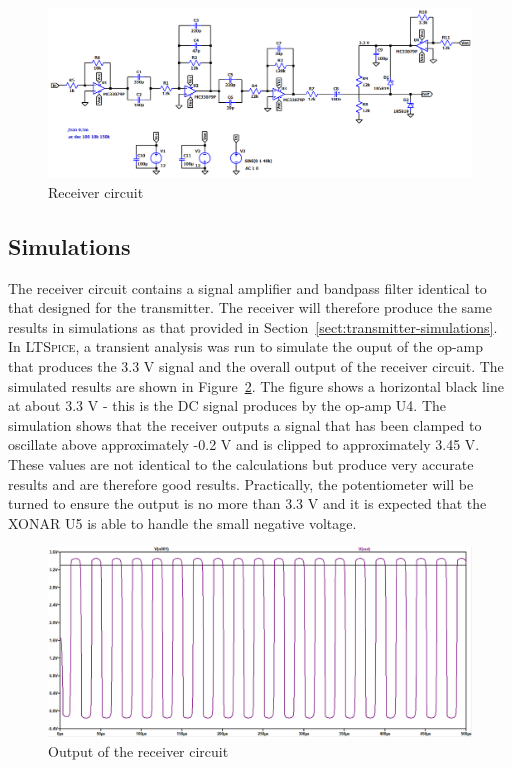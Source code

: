 \documentclass[class=report,11pt,crop=false]{standalone}
\begin{document}
\begin{figure}[htbp]
    \centering
    \includegraphics[width=0.8\columnwidth]{../Images/receiver_circuit_diagram.png}
    \caption{Receiver circuit}
    \label{fig:receiver-circuit}
\end{figure}

\subsection{Simulations}
The receiver circuit contains a signal amplifier and bandpass filter identical to that designed for the transmitter. The receiver will therefore produce the same results in simulations as that provided in Section~\ref{sect:transmitter-simulations}. In \textsc{LTSpice}, a transient analysis was run to simulate the ouput of the op-amp that produces the 3.3 V signal and the overall output of the receiver circuit. The simulated results are shown in Figure~\ref{fig:receiver-output-simulation}. The figure shows a horizontal black line at about 3.3 V - this is the DC signal produces by the op-amp U4. The simulation shows that the receiver outputs a signal that has been clamped to oscillate above approximately -0.2 V and is clipped to approximately 3.45 V. These values are not identical to the calculations but produce very accurate results and are therefore good results. Practically, the potentiometer will be turned to ensure the output is no more than 3.3 V and it is expected that the XONAR U5 is able to handle the small negative voltage.  

\begin{figure}[htbp]
    \centering
    \includegraphics[width=0.8\columnwidth]{../Images/sim/receiver_simulation.png}
    \caption{Output of the receiver circuit}
    \label{fig:receiver-output-simulation}
\end{figure}
\end{document}

